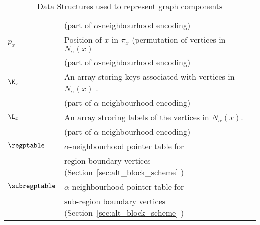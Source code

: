 \begin{table*}[ht]
\begin{tabular}{ l | l}
			 & (part of $\alpha$-neighbourhood encoding) \\
			$p_x$ & Position of $x$ in $\pi_x$ (permutation of vertices in $N_\alpha(x)$\\
			 & (part of $\alpha$-neighbourhood encoding) \\
			$\K_x$ & An array storing keys associated with vertices in  $N_\alpha(x)$ . \\
			 & (part of $\alpha$-neighbourhood encoding) \\		
			$\L_x$ & An array stroring labels of the vertices in $N_\alpha(x)$. \\
			& (part of $\alpha$-neighbourhood encoding) \\ 
			$\regptable$ & $\alpha$-neighbourhood pointer table for \\
			& region boundary vertices (Section~\ref{sec:alt_block_scheme} ) \\
			$\subregptable$ & $\alpha$-neighbourhood pointer table for \\
			& sub-region boundary vertices (Section~\ref{sec:alt_block_scheme} ) \\ \hline
		\end{tabular}
	\caption{Data Structures used to represent graph components}
	\label{tab:data_structs}
\end{table*}

\newpage